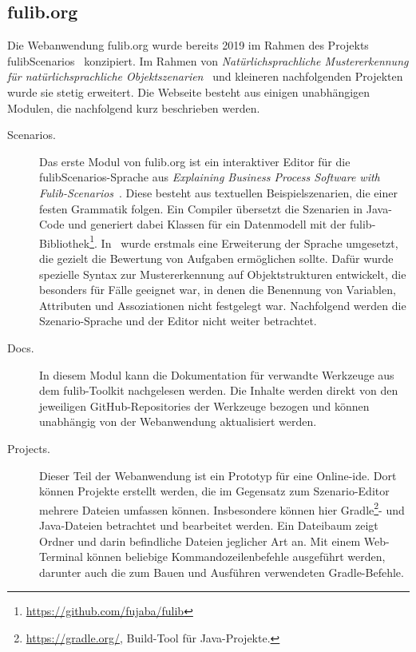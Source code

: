 \subsection{fulib.org}\label{subsec:fulib.org}

Die Webanwendung fulib.org wurde bereits 2019 im Rahmen des Projekts fulibScenarios~\cite{explain} konzipiert.
Im Rahmen von \textit{Natürlichsprachliche Mustererkennung für natürlichsprachliche Objektszenarien}~\cite{bachelor-thesis} und kleineren nachfolgenden Projekten wurde sie stetig erweitert.
Die Webseite besteht aus einigen unabhängigen Modulen, die nachfolgend kurz beschrieben werden.

\begin{description}
    \item[Scenarios.]
    Das erste Modul von fulib.org ist ein interaktiver Editor für die fulibScenarios-Sprache aus \textit{Explaining Business Process Software with Fulib-Scenarios}~\cite{explain}.
    Diese besteht aus textuellen Beispielszenarien, die einer festen Grammatik folgen.
    Ein Compiler übersetzt die Szenarien in Java-Code und generiert dabei Klassen für ein Datenmodell mit der fulib-Bibliothek\footnote{\url{https://github.com/fujaba/fulib}}.
    In~\cite{bachelor-thesis} wurde erstmals eine Erweiterung der Sprache umgesetzt, die gezielt die Bewertung von Aufgaben ermöglichen sollte.
    Dafür wurde spezielle Syntax zur Mustererkennung auf Objektstrukturen entwickelt, die besonders für Fälle geeignet war, in denen die Benennung von Variablen, Attributen und Assoziationen nicht festgelegt war.
    Nachfolgend werden die Szenario-Sprache und der Editor nicht weiter betrachtet.
    \item[Docs.]
    In diesem Modul kann die Dokumentation für verwandte Werkzeuge aus dem fulib-Toolkit nachgelesen werden.
    Die Inhalte werden direkt von den jeweiligen GitHub-Repositories der Werkzeuge bezogen und können unabhängig von der Webanwendung aktualisiert werden.
    \item[Projects.]
    Dieser Teil der Webanwendung ist ein Prototyp für eine Online-\ac{ide}.
    Dort können Projekte erstellt werden, die im Gegensatz zum Szenario-Editor mehrere Dateien umfassen können.
    Insbesondere können hier Gradle\footnote{
        \url{https://gradle.org/}, Build-Tool für Java-Projekte.
    }- und Java-Dateien betrachtet und bearbeitet werden.
    Ein Dateibaum zeigt Ordner und darin befindliche Dateien jeglicher Art an.
    Mit einem Web-Terminal können beliebige Kommandozeilenbefehle ausgeführt werden, darunter auch die zum Bauen und Ausführen verwendeten Gradle-Befehle.

\end{description}

